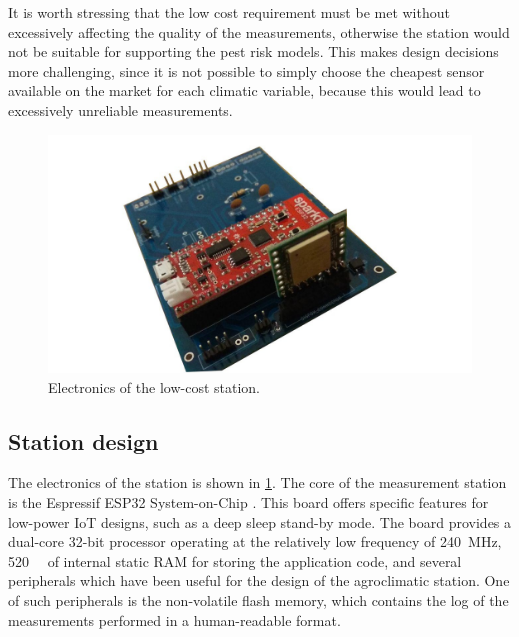 \documentclass[conference]{IEEEtran}
\begin{document}
It is worth stressing that the low cost requirement must be met without excessively affecting the quality of the measurements, otherwise the station would not be suitable for supporting the pest risk models. This makes design decisions more challenging, since it is not possible to simply choose the cheapest sensor available on the market for each climatic variable, because this would lead to excessively unreliable measurements.

\begin{figure}
    \centering
    \includegraphics[scale=.15]{lcn_board.jpg} %
    \caption{Electronics of the low-cost station.}
    \label{fig:station}
\end{figure}

\subsection{Station design}
The electronics of the station is shown in \cref{fig:station}.
The core of the measurement station is the Espressif ESP32 System-on-Chip \cite{espressif:sparkfun}. 
This board offers specific features for low-power IoT designs, such as a deep sleep stand-by mode. 
The board provides a dual-core 32-bit processor operating at the relatively low frequency of \SI{240}{\mega\hertz}, \SI{520}{\kilo\byte} of internal static RAM for storing the application code, and several peripherals which have been useful for the design of the agroclimatic station. 
One of such peripherals is the non-volatile flash memory, which contains the log of the measurements performed in a human-readable format. %

\end{document}
